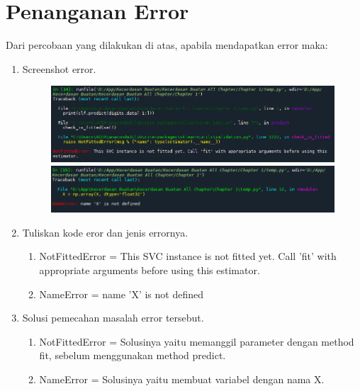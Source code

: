 \newpage
\section{Penanganan Error}
Dari percobaan yang dilakukan di atas, apabila mendapatkan error maka:

\begin{enumerate}
	\item Screenshot error.
	\begin{figure}[!htbp]
		\centering
		\includegraphics[scale=0.5]{figures/6.PNG}
		\includegraphics[scale=0.5]{figures/7.PNG}
	\end{figure}
	
	\item Tuliskan kode eror dan jenis errornya.
	\begin{enumerate}
		\item NotFittedError = This SVC instance is not fitted yet. Call ’fit’ with appropriate arguments before using this estimator.
		\item NameError = name ’X’ is not defined
	\end{enumerate}

	\item Solusi pemecahan masalah error tersebut.
	\begin{enumerate}
		\item NotFittedError = Solusinya yaitu memanggil parameter dengan method fit,
		sebelum menggunakan method predict.
		\item NameError = Solusinya yaitu membuat variabel dengan nama X.
	\end{enumerate}

\end{enumerate}

